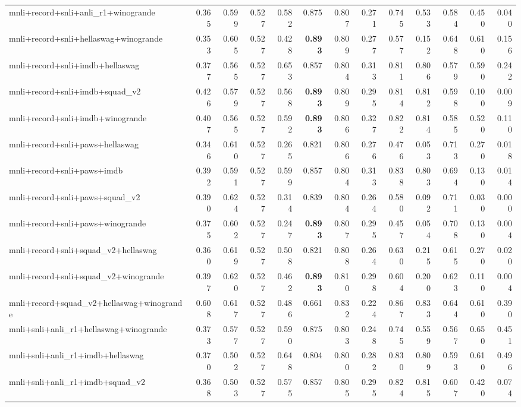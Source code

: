 \begin{table}[t]
\begin{tabular}{lrrrrrrrrrrrr}
    mnli+record+snli+anli\_r1+winogrande & 0.365 & 0.599 & 0.527 & 0.582 & 0.875 & 0.807 & 0.271 & 0.745 & 0.533 & 0.584 & 0.450 & 0.040 \\
    mnli+record+snli+hellaswag+winogrande & 0.353 & 0.605 & 0.527 & 0.428 & \textbf{0.893} & 0.809 & 0.277 & 0.577 & 0.152 & 0.648 & 0.610 & 0.156 \\
    mnli+record+snli+imdb+hellaswag & 0.377 & 0.565 & 0.527 & 0.653 & 0.857 & 0.804 & 0.313 & 0.811 & 0.806 & 0.579 & 0.590 & 0.242 \\
    mnli+record+snli+imdb+squad\_v2 & 0.426 & 0.579 & 0.527 & 0.568 & \textbf{0.893} & 0.809 & 0.295 & 0.814 & 0.812 & 0.598 & 0.100 & 0.009 \\
    mnli+record+snli+imdb+winogrande & 0.407 & 0.565 & 0.527 & 0.592 & \textbf{0.893} & 0.806 & 0.327 & 0.822 & 0.814 & 0.585 & 0.520 & 0.110 \\
    mnli+record+snli+paws+hellaswag & 0.346 & 0.610 & 0.527 & 0.265 & 0.821 & 0.806 & 0.276 & 0.476 & 0.053 & 0.713 & 0.270 & 0.018 \\
    mnli+record+snli+paws+imdb & 0.392 & 0.591 & 0.527 & 0.599 & 0.857 & 0.804 & 0.313 & 0.838 & 0.803 & 0.694 & 0.130 & 0.014 \\
    mnli+record+snli+paws+squad\_v2 & 0.390 & 0.624 & 0.527 & 0.314 & 0.839 & 0.804 & 0.264 & 0.580 & 0.092 & 0.711 & 0.030 & 0.000 \\
    mnli+record+snli+paws+winogrande & 0.375 & 0.602 & 0.527 & 0.247 & \textbf{0.893} & 0.807 & 0.295 & 0.457 & 0.054 & 0.708 & 0.130 & 0.004 \\
    mnli+record+snli+squad\_v2+hellaswag & 0.360 & 0.619 & 0.527 & 0.508 & 0.821 & 0.808 & 0.264 & 0.630 & 0.215 & 0.615 & 0.270 & 0.020 \\
    mnli+record+snli+squad\_v2+winogrande & 0.397 & 0.620 & 0.527 & 0.462 & \textbf{0.893} & 0.810 & 0.298 & 0.604 & 0.200 & 0.623 & 0.110 & 0.004 \\
    mnli+record+squad\_v2+hellaswag+winogrande & 0.608 & 0.617 & 0.527 & 0.486 & 0.661 & 0.832 & 0.224 & 0.867 & 0.833 & 0.644 & 0.610 & 0.390 \\
    mnli+snli+anli\_r1+hellaswag+winogrande & 0.373 & 0.577 & 0.527 & 0.590 & 0.875 & 0.803 & 0.248 & 0.745 & 0.559 & 0.567 & 0.650 & 0.451 \\
    mnli+snli+anli\_r1+imdb+hellaswag & 0.370 & 0.502 & 0.527 & 0.648 & 0.804 & 0.800 & 0.282 & 0.830 & 0.809 & 0.593 & 0.610 & 0.496 \\
    mnli+snli+anli\_r1+imdb+squad\_v2 & 0.368 & 0.503 & 0.527 & 0.575 & 0.857 & 0.805 & 0.295 & 0.824 & 0.815 & 0.607 & 0.420 & 0.074 \\

\end{tabular}
\end{table}
